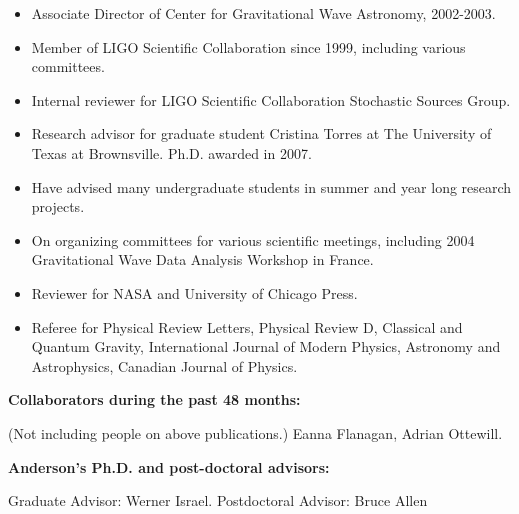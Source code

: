 \documentclass[11pt]{NSF}
\begin{document}
\begin{itemize}

\item Associate Director of Center for Gravitational Wave Astronomy,
   2002-2003.
\item Member of LIGO Scientific Collaboration since 1999, including various
   committees.
\item Internal reviewer for LIGO Scientific Collaboration Stochastic Sources
   Group.
\item  Research advisor for graduate student Cristina Torres at The
   University of Texas at Brownsville.  Ph.D. awarded in 2007.
\item Have advised many undergraduate students in summer and year long
   research projects.  
\item On organizing committees for various scientific meetings, including
   2004 Gravitational Wave Data Analysis Workshop in France.
\item Reviewer for NASA and University of Chicago Press.
\item Referee for Physical Review Letters, Physical Review D, Classical and
   Quantum Gravity,  International Journal of Modern Physics, Astronomy and
   Astrophysics, Canadian Journal of Physics.
\end{itemize}

\noindent
{\bf Collaborators during the past 48 months:}

\noindent
(Not including people on above publications.)  Eanna Flanagan, Adrian
Ottewill.
\mbox{}\newline

\noindent
{\bf Anderson's Ph.D. and post-doctoral advisors:}

\noindent
Graduate Advisor: Werner Israel. Postdoctoral Advisor: Bruce Allen
\noindent
\end{document}

